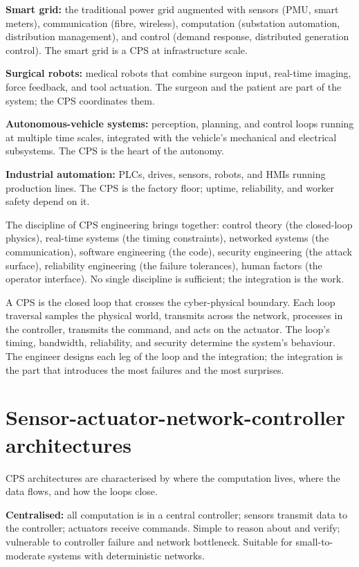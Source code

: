 \textbf{Smart grid:} the traditional power grid augmented with sensors (PMU, smart meters), communication (fibre, wireless), computation (substation automation, distribution management), and control (demand response, distributed generation control). The smart grid is a CPS at infrastructure scale.

\textbf{Surgical robots:} medical robots that combine surgeon input, real-time imaging, force feedback, and tool actuation. The surgeon and the patient are part of the system; the CPS coordinates them.

\textbf{Autonomous-vehicle systems:} perception, planning, and control loops running at multiple time scales, integrated with the vehicle's mechanical and electrical subsystems. The CPS is the heart of the autonomy.

\textbf{Industrial automation:} PLCs, drives, sensors, robots, and HMIs running production lines. The CPS is the factory floor; uptime, reliability, and worker safety depend on it.

The discipline of CPS engineering brings together: control theory (the closed-loop physics), real-time systems (the timing constraints), networked systems (the communication), software engineering (the code), security engineering (the attack surface), reliability engineering (the failure tolerances), human factors (the operator interface). No single discipline is sufficient; the integration is the work.

\begin{archetype}
A CPS is the closed loop that crosses the cyber-physical boundary. Each loop traversal samples the physical world, transmits across the network, processes in the controller, transmits the command, and acts on the actuator. The loop's timing, bandwidth, reliability, and security determine the system's behaviour. The engineer designs each leg of the loop and the integration; the integration is the part that introduces the most failures and the most surprises.
\end{archetype}

\section{Sensor-actuator-network-controller architectures}

CPS architectures are characterised by where the computation lives, where the data flows, and how the loops close.

\textbf{Centralised:} all computation is in a central controller; sensors transmit data to the controller; actuators receive commands. Simple to reason about and verify; vulnerable to controller failure and network bottleneck. Suitable for small-to-moderate systems with deterministic networks.

